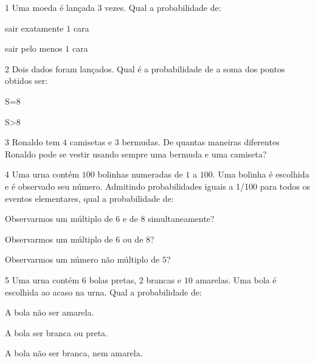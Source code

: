 
\num{1}  Uma moeda é lançada $3$ vezes. Qual a probabilidade de:

\begin{escolha}
\item sair exatamente $1$ cara 
\item sair pelo menos $1$ cara 
\end{escolha}

\num{2}  Dois dados foram lançados. Qual é a probabilidade de a soma dos
pontos obtidos ser:

\begin{escolha}
\item S=8 
\item S\textgreater8 
\end{escolha}

\num{3}  Ronaldo tem $4$ camisetas e $3$ bermudas. De quantas maneiras diferentes
Ronaldo pode se vestir usando sempre uma bermuda e uma camiseta?


\num{4}  Uma urna contém $100$ bolinhas numeradas de $1$ a $100$. Uma bolinha é
escolhida e é observado seu número. Admitindo probabilidades iguais a
1/100 para todos os eventos elementares, qual a probabilidade de:

\begin{escolha}
\item Observarmos um múltiplo de $6$ e de $8$ simultaneamente? 
\item Observarmos um múltiplo de $6$ ou de $8$? 
\item Observarmos um número não múltiplo de $5$? 
\end{escolha}

\num{5}  Uma urna contém $6$ bolas pretas, $2$ brancas e $10$ amarelas. Uma bola é
escolhida ao acaso na urna. Qual a probabilidade de:

\begin{escolha}
\item A bola não ser amarela. 
\item A bola ser branca ou preta. 
\item A bola não ser branca, nem amarela. 
\end{escolha}

